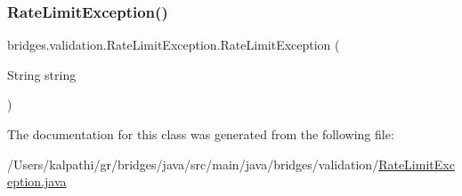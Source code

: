 \subsubsection{\texorpdfstring{RateLimitException()}{RateLimitException()}}
{\footnotesize\ttfamily bridges.\+validation.\+Rate\+Limit\+Exception.\+Rate\+Limit\+Exception (\begin{DoxyParamCaption}\item[{String}]{string }\end{DoxyParamCaption})}



The documentation for this class was generated from the following file\+:\begin{DoxyCompactItemize}
\item 
/\+Users/kalpathi/gr/bridges/java/src/main/java/bridges/validation/\mbox{\hyperlink{_rate_limit_exception_8java}{Rate\+Limit\+Exception.\+java}}\end{DoxyCompactItemize}
